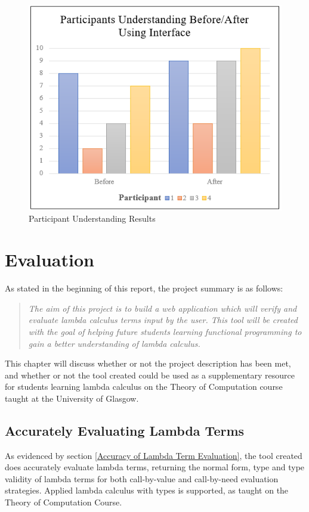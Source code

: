 \documentclass[a4paper,11pt]{report}
\begin{document}
\begin{figure}[h]
	\includegraphics{images/participant_understanding}
	\centering
	\caption{Participant Understanding Results}
	\label{participant_understanding}
\end{figure}

\chapter{Evaluation}

As stated in the beginning of this report, the project summary is as follows:

\begin{quote}
	 \textit{The aim of this project is to build a web application which will verify and evaluate lambda calculus terms input by the user. This tool will be created with the goal of helping future students learning functional programming to gain a better understanding of lambda calculus.}
\end{quote}

This chapter will discuss whether or not the project description has been met, and whether or not the tool created could be used as a supplementary resource for students learning lambda calculus on the Theory of Computation course taught at the University of Glasgow.

\section{Accurately Evaluating Lambda Terms}
As evidenced by section \ref{Accuracy of Lambda Term Evaluation}, the tool created does accurately evaluate lambda terms, returning the normal form, type and type validity of lambda terms for both call-by-value and call-by-need evaluation strategies. Applied lambda calculus with types is supported, as taught on the Theory of Computation Course.
\end{document}
